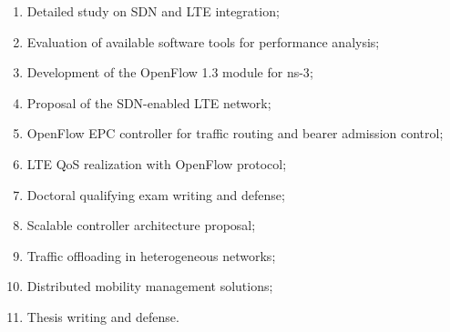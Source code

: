 \begin{enumerate}
	\itemsep0pt
  \item Detailed study on \ac{SDN} and \ac{LTE} integration;
  \item Evaluation of available software tools for performance analysis;
  \item Development of the OpenFlow 1.3 module for \ac{ns-3};
  \item Proposal of the \ac{SDN}-enabled \ac{LTE} network;
  \item OpenFlow \ac{EPC} controller for traffic routing and bearer admission
        control;
  \item \ac{LTE} \ac{QoS} realization with OpenFlow protocol;
  \item Doctoral qualifying exam writing and defense;
  \item Scalable controller architecture proposal;
  \item Traffic offloading in heterogeneous networks;
  \item Distributed mobility management solutions;
  \item Thesis writing and defense.
\end{enumerate}

